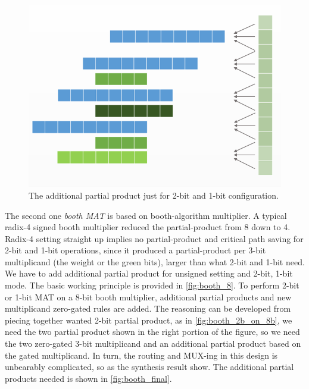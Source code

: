 \begin{figure}[t]
    \centering
    \includegraphics[width=0.8\linewidth]{inc/4_proposed_architecture/figure/booth_final.png}
    \caption{The additional partial product just for 2-bit and 1-bit configuration.}
    \label{fig:booth_final}
\end{figure}
The second one \textit{booth MAT} is based on booth-algorithm multiplier. A typical radix-4 signed booth multiplier reduced the partial-product from 8 down to 4. Radix-4 setting straight up implies no partial-product and critical path saving for 2-bit and 1-bit operations, since it produced a partial-product per 3-bit multiplicand (the weight or the green bits), larger than what 2-bit and 1-bit need. We have to add additional partial product for unsigned setting and 2-bit, 1-bit mode. The basic working principle is provided in \autoref{fig:booth_8}. To perform 2-bit or 1-bit MAT on a 8-bit booth multiplier, additional partial products and new multiplicand zero-gated rules are added. The reasoning can be developed from piecing together wanted 2-bit partial product, as in \autoref{fig:booth_2b_on_8b}, we need the two partial product shown in the right portion of the figure, so we need the two zero-gated 3-bit multiplicand and an additional partial product based on the gated multiplicand. In turn, the routing and MUX-ing in this design is unbearably complicated, so as the synthesis result show. The additional partial products needed is shown in \autoref{fig:booth_final}. \\
